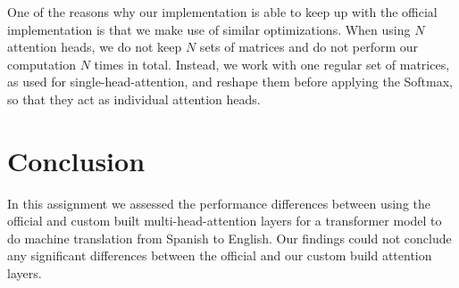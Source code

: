\documentclass{scrartcl}
\begin{document}
One of the reasons why our implementation is able to keep up with the official implementation is that we make use of similar optimizations. When using $N$ attention heads, we do not keep $N$ sets of matrices and do not perform our computation $N$ times in total. Instead, we work with one regular set of matrices, as used for single-head-attention, and reshape them before applying the Softmax, so that they act as individual attention heads.

\section{Conclusion}
In this assignment we assessed the performance differences between using the official and custom built multi-head-attention layers for a transformer model to do machine translation from Spanish to English. Our findings could not conclude any significant differences between the official and our custom build attention layers. 
\end{document}
